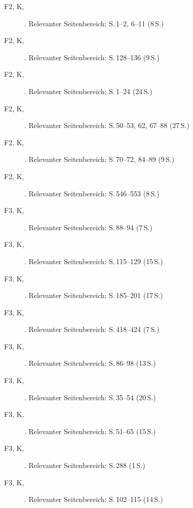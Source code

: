 \begin{description}
  \item[F2, K, \cite{saegesserwyss2021grafinkrahmenmodell}] . Relevanter Seitenbereich: S.\,1--2, 6--11 (8\,S.)
  \item[F2, K, \cite{nottbusch2017graphomotorik}] . Relevanter Seitenbereich: S.\,128--136 (9\,S.)
  \item[F2, K, \cite{hurschler2020handschriftbeurteilung}] . Relevanter Seitenbereich: S.\,1--24 (24\,S.)
  \item[F2, K, \cite{gold2018lesenkannmanlernen}] . Relevanter Seitenbereich: S.\,50--53, 62, 67--88 (27\,S.)
  \item[F2, K, \cite{lehwald2017motivation}] . Relevanter Seitenbereich: S.\,70--72, 84--89 (9\,S.)
  \item[F2, K, \cite{greiten2021underachievement}] . Relevanter Seitenbereich: S.\,546--553 (8\,S.)
  \item[F3, K, \cite{grossrieder2010anerkennung}] . Relevanter Seitenbereich: S.\,88--94 (7\,S.)
  \item[F3, K, \cite{baudson2021wasdenken}] . Relevanter Seitenbereich: S.\,115--129 (15\,S.)
  \item[F3, K, \cite{kuhl2021begabungbildungbeziehung}] . Relevanter Seitenbereich: S.\,185--201 (17\,S.)
  \item[F3, K, \cite{wagener2021bfhemmendfoerdernd}] . Relevanter Seitenbereich: S.\,418--424 (7\,S.)
  \item[F3, K, \cite{behrensen2019inklusive}] . Relevanter Seitenbereich: S.\,86--98 (13\,S.)
  \item[F3, K, \cite{kuhl2019diversitaet}] . Relevanter Seitenbereich: S.\,35--54 (20\,S.)
  \item[F3, K, \cite{boosnuenning2022interethnisch}] . Relevanter Seitenbereich: S.\,51--65 (15\,S.)
  \item[F3, K, \cite{kesselshannover2015gleichaltrige}] . Relevanter Seitenbereich: S.\,288 (1\,S.)
  \item[F3, K, \cite{stamm2014mirage}] . Relevanter Seitenbereich: S.\,102--115 (14\,S.)

\end{description}
